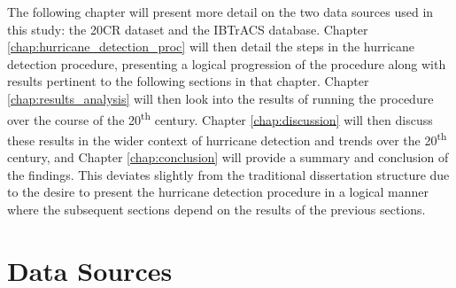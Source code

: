 \documentclass[pdftex,12pt,a4paper]{report}
\newcommand{\ts}{\textsuperscript}
\begin{document}

The following chapter will present more detail on the two data sources used in this study: the 20CR
dataset and the IBTrACS database. Chapter \ref{chap:hurricane_detection_proc} will then detail the
steps in the hurricane detection procedure, presenting a logical progression of the procedure along
with results pertinent to the following sections in that chapter. Chapter
\ref{chap:results_analysis} will then look into the results of running the procedure over the course
of the 20\ts{th} century.  Chapter \ref{chap:discussion} will then discuss these results in the
wider context of hurricane detection and trends over the 20\ts{th} century, and Chapter
\ref{chap:conclusion} will provide a summary and conclusion of the findings. This deviates slightly
from the traditional dissertation structure due to the desire to present the hurricane detection
procedure in a logical manner where the subsequent sections depend on the results of the previous
sections.

\chapter{Data Sources}
\end{document}
